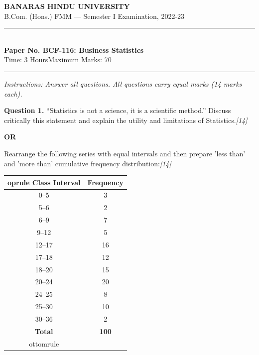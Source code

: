 \documentclass[11pt,a4paper]{article}
\newcommand{\pts}[1]{\hfill   \textit{[#1]}}
\begin{document}
\begin{center}
  {\large\bfseries BANARAS HINDU UNIVERSITY}\\[2pt]
  {\normalsize B.Com. (Hons.) FMM --- Semester I Examination, 2022-23}\\[6pt]
  \rule{0.8\linewidth}{0.5pt}\\[6pt]
  {\large\bfseries Paper No. BCF-116: Business Statistics}\\[4pt]
  {\normalsize Time: 3 Hours\hfill Maximum Marks: 70}
\end{center}

\rule{\linewidth}{0.4pt}

\smallskip



\noindent   \textit{Instructions: Answer all questions. All questions carry equal marks (14 marks each).}

\bigskip




\noindent   \textbf{Question 1.}
``Statistics is not a science, it is a scientific method.'' Discuss critically this statement and explain the utility and limitations of Statistics.\pts{14}

\centerline{   \textbf{OR}}

Rearrange the following series with equal intervals and then prepare 'less than' and 'more than' cumulative frequency distribution:\pts{14}

\begin{center}
  \small
  
\begin{tabular}{cc}
     oprule
   \textbf{Class Interval} &   \textbf{Frequency} \\
    \midrule
    0--5   & 3   \\
    5--6   & 2   \\
    6--9   & 7   \\
    9--12  & 5   \\
    12--17 & 16  \\
    17--18 & 12  \\
    18--20 & 15  \\
    20--24 & 20  \\
    24--25 & 8   \\
    25--30 & 10  \\
    30--36 & 2   \\
    \midrule
   \textbf{Total} &   \textbf{100} \\
    ottomrule
  \end{tabular}
\end{center}
\end{document}
